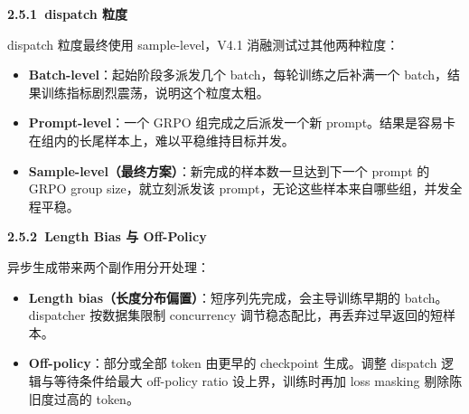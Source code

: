 \documentclass[zihao=false,fontset=windows]{ctexart}
\begin{document}
\par{}\vspace{0.8em}\noindent \begin{tcolorbox}[boxrule=0pt,arc=3pt,colback=callGreen,left=3pt,right=3pt,top=2pt,bottom=2pt,before skip=0pt,after skip=0pt]{\bfseries \textcolor{feishuBlue}{2.5.1}\ dispatch 粒度}\end{tcolorbox}\par\vspace{0.28em}

dispatch 粒度最终使用 sample-level，V4.1 消融测试过其他两种粒度：\par
\begin{itemize}
\item 
\textbf{Batch-level}：起始阶段多派发几个 batch，每轮训练之后补满一个 batch，结果训练指标剧烈震荡，说明这个粒度太粗。\par
\item 
\textbf{Prompt-level}：一个 GRPO 组完成之后派发一个新 prompt。结果是容易卡在组内的长尾样本上，难以平稳维持目标并发。\par
\item 
\textbf{Sample-level（最终方案）}：新完成的样本数一旦达到下一个 prompt 的 GRPO group size，就立刻派发该 prompt，无论这些样本来自哪些组，并发全程平稳。\par
\end{itemize}

\par{}\vspace{0.8em}\noindent \begin{tcolorbox}[boxrule=0pt,arc=3pt,colback=callGreen,left=3pt,right=3pt,top=2pt,bottom=2pt,before skip=0pt,after skip=0pt]{\bfseries \textcolor{feishuBlue}{2.5.2}\ Length Bias 与 Off-Policy}\end{tcolorbox}\par\vspace{0.28em}

异步生成带来两个副作用分开处理：\par
\begin{itemize}
\item 
\textbf{Length bias（长度分布偏置）}：短序列先完成，会主导训练早期的 batch。dispatcher 按数据集限制 concurrency 调节稳态配比，再丢弃过早返回的短样本。\par
\item 
\textbf{Off-policy}：部分或全部 token 由更早的 checkpoint 生成。调整 dispatch 逻辑与等待条件给最大 off-policy ratio 设上界，训练时再加 loss masking 剔除陈旧度过高的 token。\par
\end{itemize}
\end{document}
